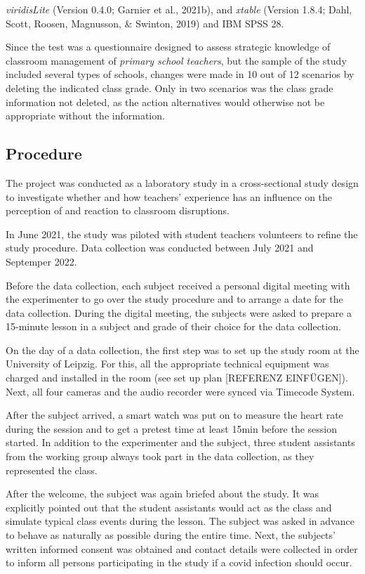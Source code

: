 \documentclass[
  man]{apa6}
\begin{document}
\emph{viridisLite} (Version 0.4.0; Garnier et al., 2021b), and \emph{xtable} (Version 1.8.4; Dahl, Scott, Roosen, Magnusson, \& Swinton, 2019) and IBM SPSS 28.

Since the test was a questionnaire designed to assess strategic knowledge of classroom management of \emph{primary school teachers}, but the sample of the study included several types of schools, changes were made in 10 out of 12 scenarios by deleting the indicated class grade. Only in two scenarios was the class grade information not deleted, as the action alternatives would otherwise not be appropriate without the information.

\hypertarget{procedure}{%
\subsection{Procedure}\label{procedure}}

The project was conducted as a laboratory study in a cross-sectional study design to investigate whether and how teachers' experience has an influence on the perception of and reaction to classroom disruptions.

In June 2021, the study was piloted with student teachers volunteers to refine the study procedure. Data collection was conducted between July 2021 and Septemper 2022.

Before the data collection, each subject received a personal digital meeting with the experimenter to go over the study procedure and to arrange a date for the data collection. During the digital meeting, the subjects were asked to prepare a 15-minute lesson in a subject and grade of their choice for the data collection.

On the day of a data collection, the first step was to set up the study room at the University of Leipzig. For this, all the appropriate technical equipment was charged and installed in the room (see set up plan {[}REFERENZ EINFÜGEN{]}). Next, all four cameras and the audio recorder were synced via Timecode System.

After the subject arrived, a smart watch was put on to measure the heart rate during the session and to get a pretest time at least 15min before the session started. In addition to the experimenter and the subject, three student assistants from the working group always took part in the data collection, as they represented the class.

After the welcome, the subject was again briefed about the study. It was explicitly pointed out that the student assistants would act as the class and simulate typical class events during the lesson. The subject was asked in advance to behave as naturally as possible during the entire time. Next, the subjects' written informed consent was obtained and contact details were collected in order to inform all persons participating in the study if a covid infection should occur.
\end{document}
